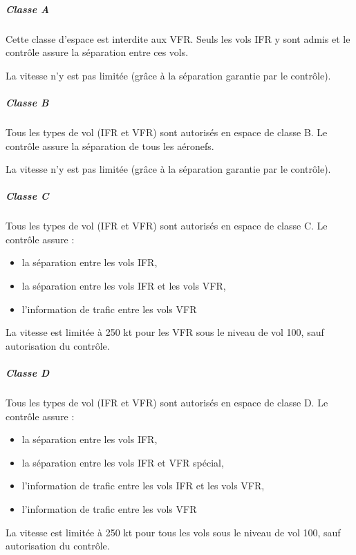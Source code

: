 		\subparagraph{Classe A}
		Cette classe d'espace est interdite aux VFR. Seuls les vols IFR y sont admis et le contrôle assure la séparation entre ces vols.
		
		
		La vitesse n'y est pas limitée (grâce à la séparation garantie par le contrôle).
		
		\subparagraph{Classe B}
		Tous les types de vol (IFR et VFR) sont autorisés en espace de classe B. Le contrôle assure la séparation de tous les aéronefs.
		
		
		La vitesse n'y est pas limitée (grâce à la séparation garantie par le contrôle).
		
		\subparagraph{Classe C}
		Tous les types de vol (IFR et VFR) sont autorisés en espace de classe C. Le contrôle assure :
		\begin{itemize}
		\item la séparation entre les vols IFR,
		\item la séparation entre les vols IFR et les vols VFR,
		\item l'information de trafic entre les vols VFR
		\end{itemize}
		
		
		La vitesse est limitée à 250 kt pour les VFR sous le niveau de vol 100, sauf autorisation du contrôle.
		
		\subparagraph{Classe D}\label{classeD}
		Tous les types de vol (IFR et VFR) sont autorisés en espace de classe D. Le contrôle assure :
		\begin{itemize}
		\item la séparation entre les vols IFR,
		\item la séparation entre les vols IFR et VFR spécial,
		\item l'information de trafic entre les vols IFR et les vols VFR,
		\item l'information de trafic entre les vols VFR
		\end{itemize}
		
		
		La vitesse est limitée à 250 kt pour tous les vols sous le niveau de vol 100, sauf autorisation du contrôle.
		
